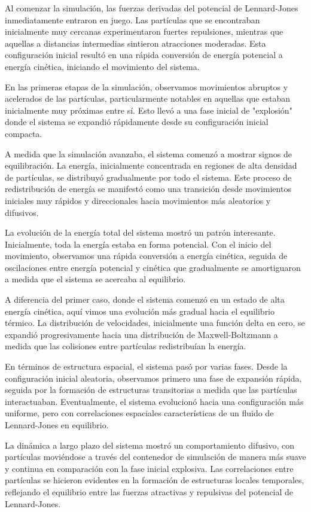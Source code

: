 \documentclass[twocolumn]{article}
\begin{document}
Al comenzar la simulación, las fuerzas derivadas del potencial de Lennard-Jones inmediatamente entraron en juego. Las partículas que se encontraban inicialmente muy cercanas experimentaron fuertes repulsiones, mientras que aquellas a distancias intermedias sintieron atracciones moderadas. Esta configuración inicial resultó en una rápida conversión de energía potencial a energía cinética, iniciando el movimiento del sistema.

En las primeras etapas de la simulación, observamos movimientos abruptos y acelerados de las partículas, particularmente notables en aquellas que estaban inicialmente muy próximas entre sí. Esto llevó a una fase inicial de "explosión" donde el sistema se expandió rápidamente desde su configuración inicial compacta.

A medida que la simulación avanzaba, el sistema comenzó a mostrar signos de equilibración. La energía, inicialmente concentrada en regiones de alta densidad de partículas, se distribuyó gradualmente por todo el sistema. Este proceso de redistribución de energía se manifestó como una transición desde movimientos iniciales muy rápidos y direccionales hacia movimientos más aleatorios y difusivos.

La evolución de la energía total del sistema mostró un patrón interesante. Inicialmente, toda la energía estaba en forma potencial. Con el inicio del movimiento, observamos una rápida conversión a energía cinética, seguida de oscilaciones entre energía potencial y cinética que gradualmente se amortiguaron a medida que el sistema se acercaba al equilibrio.

A diferencia del primer caso, donde el sistema comenzó en un estado de alta energía cinética, aquí vimos una evolución más gradual hacia el equilibrio térmico. La distribución de velocidades, inicialmente una función delta en cero, se expandió progresivamente hacia una distribución de Maxwell-Boltzmann a medida que las colisiones entre partículas redistribuían la energía.

En términos de estructura espacial, el sistema pasó por varias fases. Desde la configuración inicial aleatoria, observamos primero una fase de expansión rápida, seguida por la formación de estructuras transitorias a medida que las partículas interactuaban. Eventualmente, el sistema evolucionó hacia una configuración más uniforme, pero con correlaciones espaciales características de un fluido de Lennard-Jones en equilibrio.

La dinámica a largo plazo del sistema mostró un comportamiento difusivo, con partículas moviéndose a través del contenedor de simulación de manera más suave y continua en comparación con la fase inicial explosiva. Las correlaciones entre partículas se hicieron evidentes en la formación de estructuras locales temporales, reflejando el equilibrio entre las fuerzas atractivas y repulsivas del potencial de Lennard-Jones.
\end{document}
